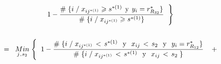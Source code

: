 \documentclass[
  11pt,
  a4paper,
]{article}
\begin{document}
\begin{gather*}
1 - \dfrac{\# \hspace{0.1 cm}\lbrace i \hspace{0.1 cm}/\hspace{0.1 cm} x_{ij^{*(1)}} \geqslant s^{*(1)} \hspace{0.15 cm}\text{y}\hspace{0.15 cm} y_i = r^*_{R_{32}} \rbrace}{\# \hspace{0.1 cm}\lbrace i \hspace{0.1 cm}/\hspace{0.1 cm} x_{ij^{*(1)}} \geqslant s^{*(1)} \rbrace}  \hspace{0.2cm}  \Biggl\}
\\ \\  =\hspace{0.2cm}   \underset{j \hspace{0.02cm},\hspace{0.02cm} s_2}  {Min} \hspace{0.1cm} \Biggl\{   \hspace{0.2cm}    1 - \dfrac{\# \hspace{0.1 cm}\lbrace i \hspace{0.1 cm}/\hspace{0.1 cm}  x_{ij^{*(1)}} \hspace{0.05cm}   < \hspace{0.05cm} s^{*(1)} \hspace{0.25 cm}\text{y}\hspace{0.25 cm} x_{ij} \hspace{0.05cm}   < \hspace{0.05cm} s_2 \hspace{0.25 cm}\text{y}\hspace{0.25 cm} y_i = r^*_{R_{12}} \rbrace}{\# \hspace{0.1 cm}\lbrace i \hspace{0.1 cm} / \hspace{0.1 cm}  x_{ij^{*(1)}} \hspace{0.05cm}   < \hspace{0.05cm} s^{*(1)} \hspace{0.25 cm}\text{y}\hspace{0.25 cm} x_{ij} \hspace{0.05cm}   < \hspace{0.05cm} s_2  \hspace{0.1 cm} \rbrace }      \hspace{0.4cm} + \\ \\

\end{gather*}
\end{document}
